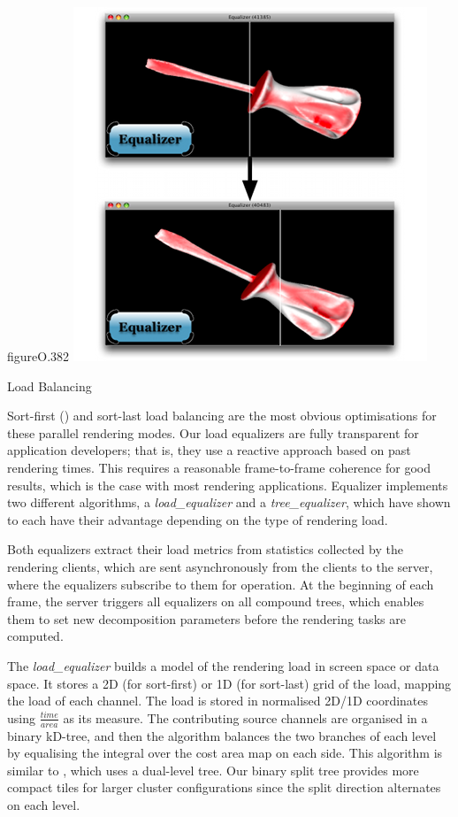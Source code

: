 \begin{wrapfloat}{figure}{O}{.382\textwidth}
  \includegraphics[width=.382\textwidth]{images/loadeq}
  \caption{\label{floadeq}Load Balancing}
\end{wrapfloat}

Sort-first () and sort-last load balancing are the most obvious
optimisations for these parallel rendering modes. Our load equalizers are fully
transparent for application developers; that is, they use a reactive approach
based on past rendering times. This requires a reasonable frame-to-frame
coherence for good results, which is the case with most rendering applications.
Equalizer implements two different algorithms, a {\em load\_equalizer} and a
{\em tree\_equalizer}, which have shown to each have their advantage
depending on the type of rendering load.

Both equalizers extract their load metrics from statistics collected by the
rendering clients, which are sent asynchronously from the clients to the
server, where the equalizers subscribe to them for operation. At the beginning
of each frame, the server triggers all equalizers on all compound trees, which
enables them to set new decomposition parameters before the rendering tasks are
computed.

The {\em load\_equalizer} builds a model of the rendering load in screen space
or data space. It stores a 2D (for sort-first) or 1D (for sort-last) grid of
the load, mapping the load of each channel. The load is stored in normalised
2D/1D coordinates using $\frac{time}{area}$ as its measure. The contributing
source channels are organised in a binary kD-tree, and then the algorithm
balances the two branches of each level by equalising the integral over the
cost area map on each side. This algorithm is similar to \cite{ACCC:04}, which
uses a dual-level tree. Our binary split tree provides more compact tiles for
larger cluster configurations since the split direction alternates on each
level.

